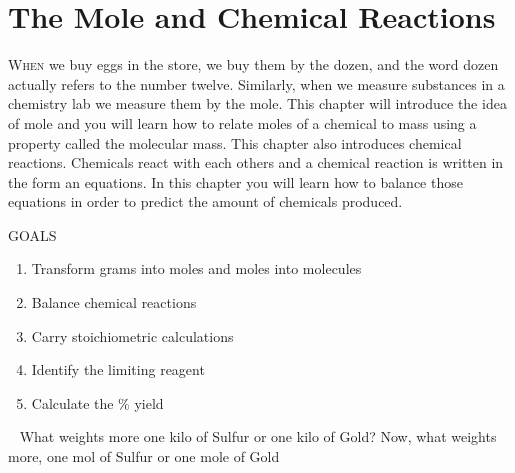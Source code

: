 \documentclass[main.tex]{subfiles}
\begin{document}
\linenumbers


\chapter[The Mole and Chemical Reactions ]{The Mole and Chemical Reactions}
\label{ch:mol}

    \begin{marginfigure}
\end{marginfigure}



\lettrine[lines=4]{\color{black!45}W}{hen} we buy eggs in the store, we buy them by the dozen, and the word dozen actually refers to the number twelve. Similarly, when we measure substances in a chemistry lab we measure them by the mole. This chapter will introduce the idea of mole and you will learn how to relate moles of a chemical to mass using a property called the molecular mass. This chapter also introduces chemical reactions. Chemicals react with each others and a chemical reaction is written in the form an equations. In this chapter you will learn how to balance those equations in order to predict the amount of chemicals produced.
\begin{marginfigure}%
\begin{mytcbox}{GOALS}
\begin{enumerate}[label=\protect\circled{\color{white}\arabic*}]
\item Transform grams into moles and moles into molecules
\item Balance chemical reactions
\item Carry stoichiometric calculations
\item Identify the limiting reagent
\item Calculate the \% yield
\end{enumerate}
\end{mytcbox}
\vspace{1cm}
\begin{tcolorbox}[enhanced,colback=red!5!white,colframe=black!50!red,boxrule=1pt,
  arc=0pt,outer arc=0pt,drop heavy lifted shadow]
\faGears\ 
 What weights more one kilo of Sulfur or one kilo of Gold? Now, what weights more, one mol of Sulfur or one mole of Gold \end{tcolorbox}
\end{marginfigure}%
\end{document}

